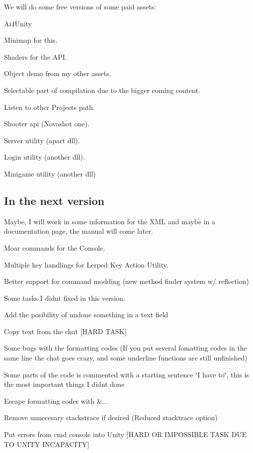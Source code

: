 We will do some free versions of some paid assets\+:


\begin{DoxyItemize}
\item Ai4\+Unity
\end{DoxyItemize}

Minimap for this.

Shaders for the A\+PI.

Object demo from my other assets.

Selectable part of compilation due to the bigger coming content.

Listen to other Projects path.

Shooter api (Novashot one).

Server utility (apart dll).

Login utility (another dll).

Minigame utility (another dll)

\subsection*{In the next version}

Maybe, I will work in some information for the X\+ML and maybe in a documentation page, the manual will come later.

Moar commands for the Console.

Multiple key handlings for Lerped Key Action Utility.

Better support for command modding (new method finder system w/ reflection)

Some tasks I didn\textquotesingle{}t fixed in this version\+:


\begin{DoxyItemize}
\item Add the posibility of undone something in a text field
\item Copy text from the chat \mbox{[}H\+A\+RD T\+A\+SK\mbox{]}
\item Some bugs with the formatting codes (If you put several fomatting codes in the same line the chat goes crazy, and some underline functions are still unfinished)
\item Some parts of the code is commented with a starting sentence \char`\"{}\+I have to\char`\"{}, this is the most important things I didn\textquotesingle{}t done
\item Escape formatting codes with \&...
\item Remove unnecesary stackstrace if desired (Reduced stacktrace option)
\item Put errors from cmd console into Unity \mbox{[}H\+A\+RD OR I\+M\+P\+O\+S\+S\+I\+B\+LE T\+A\+SK D\+UE TO U\+N\+I\+TY I\+N\+C\+A\+P\+A\+C\+I\+TY\mbox{]}
\end{DoxyItemize}

